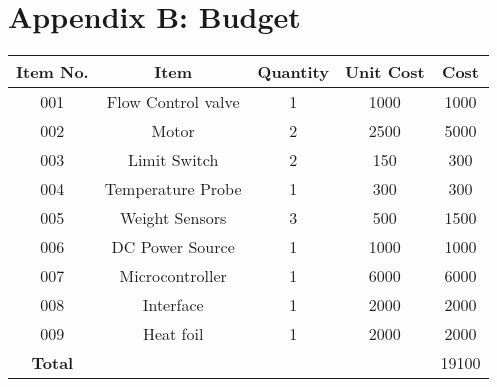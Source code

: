 \section*{Appendix B: Budget}
\begin{table}[ht]
  \begin{center}
    \leavevmode
     \begin{tabular}{|c | c | c | c | c |}\hline
      \textbf{Item No.} &  \textbf{Item} & \textbf{Quantity} & \textbf{Unit Cost} & \textbf{Cost} \\
     \hline
     001 & Flow Control valve & 1 & 1000 &  1000 \\
     \hline
     002 & Motor & 2 & 2500 &  5000 \\
     \hline
     003 & Limit Switch & 2 & 150 &  300 \\
     \hline
     004 & Temperature Probe & 1 & 300 &  300 \\
     \hline
     005 & Weight Sensors & 3 & 500 & 1500 \\
     \hline
     006 & DC Power Source & 1 & 1000 &  1000 \\
     \hline
     007 & Microcontroller &  1 & 6000 & 6000 \\
     \hline
     008 & Interface  & 1 & 2000  & 2000 \\
     \hline
     009 & Heat foil & 1 & 2000 & 2000 \\
     \hline
     \textbf{Total} & & & & 19100 \\
     \hline
    \end{tabular}
    \label{table:1}
  \end{center}
\end{table}



    